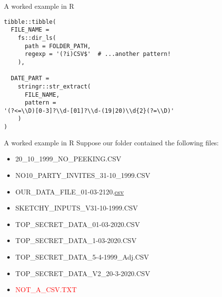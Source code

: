\documentclass[
	usenames,
	dvipsnames,
] {beamer}
\begin{document}
\begin{frame}[fragile]{A worked example in R}
	\begin{adjustwidth}{-1.5em}{-1.5em}
		\begin{lstlisting}
tibble::tibble(
  FILE_NAME =
    fs::dir_ls(
      path = FOLDER_PATH,
      regexp = '(?i)CSV$'  # ...another pattern!
    ),
  
  DATE_PART =
    stringr::str_extract(
      FILE_NAME,
      pattern =
'(?<=\\D)[0-3]?\\d-[01]?\\d-(19|20)\\d{2}(?=\\D)'
    )
)
		\end{lstlisting}
	\end{adjustwidth}
\end{frame}

\begin{frame}{A worked example in R}
	Suppose our folder contained the following files:
	\begin{ttfamily}
		\begin{itemize}[label={}]		
			\item 20\_10\_1999\_NO\_PEEKING.CSV
			\item NO10\_PARTY\_INVITES\_31-10\_1999.CSV
			\item OUR\_DATA\_FILE\_01-03-2120.\underline{csv}
			\item SKETCHY\_INPUTS\_V31-10-1999.CSV
			\item TOP\_SECRET\_DATA\_01-03-2020.CSV
			\item TOP\_SECRET\_DATA\_1-03-2020.CSV
			\item TOP\_SECRET\_DATA\_5-4-1999\_Adj.CSV
			\item TOP\_SECRET\_DATA\_V2\_20-3-2020.CSV
			\item \textcolor{red}{NOT\_A\_CSV.TXT}
		\end{itemize}
	\end{ttfamily}
\end{frame}
		
\end{document}
